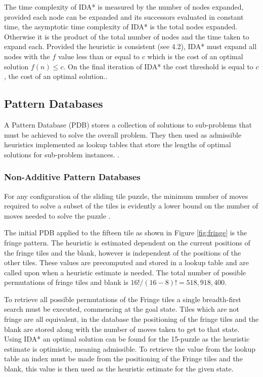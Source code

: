 \documentclass[final]{cmpreport}
\begin{document}
The time complexity of IDA* is measured by the number of nodes expanded, provided each node can be expanded and its successors evaluated in constant time, the asymptotic time complexity of IDA* is the total nodes expanded. Otherwise it is the product of the total number of nodes and the time taken to expand each. Provided the heuristic is consistent (see 4.2), IDA* must expand all nodes with the $f$ value less than or equal to $c$ which  is the cost of an optimal solution $f(n) \leq c$. On the final iteration of IDA* the cost threshold is equal to $c$, the cost of an optimal solution.\citep{DBLP:journals/ai/KorfRE01}.
\subsection{Pattern Databases}
A Pattern Database (PDB) stores a collection of solutions to sub-problems that must be achieved to solve the overall problem. They then used as admissible heuristics implemented as lookup tables that store the lengths of optimal solutions for sub-problem instances. \citep{DBLP:journals/jair/FelnerKMH07}.

\subsubsection{Non-Additive Pattern Databases}\label{Section:nonadditive}
For any configuration of the sliding tile puzzle, the minimum number of moves required to solve a subset of the tiles is evidently a lower bound on the number of moves needed to solve the puzzle \cite{felner2004additive}.





The initial PDB applied to the fifteen tile as shown in Figure \ref{fig:fringe} is the fringe pattern. The heuristic is estimated dependent on the current positions of the fringe tiles and the blank, however is independent of the positions of the other tiles. These values are precomputed and stored in a lookup table and are called upon when a heuristic estimate is needed. The total number of possible permutations of fringe tiles and blank is $16!/(16-8)!=518,918,400$. 

To retrieve all possible permutations of the Fringe tiles a single breadth-first search must be executed, commencing at the goal state. Tiles which are not fringe are all equivalent, in the database the positioning of the fringe tiles and the blank are stored along with the number of moves taken to get to that state. Using IDA* an optimal solution can be found for the 15-puzzle as the heuristic estimate is optimistic, meaning admissible. To retrieve the value from the lookup table an index must be made from the positioning of the Fringe tiles and the blank, this value is then used as the heuristic estimate for the given state.
\end{document}
